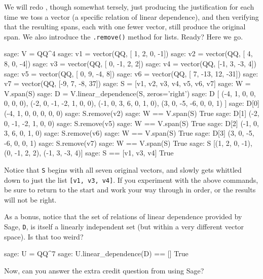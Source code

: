 We will redo , though somewhat tersely, just producing the justification for each time we toss a vector (a specific relation of linear dependence), and then verifying that the resulting spans, each with one fewer vector, still produce the original span.  We also introduce the \verb?.remove()? method for lists.  Ready?  Here we go.
%
\begin{sageexample}
sage: V = QQ^4
sage: v1 = vector(QQ,  [ 1,   2,  0,  -1])
sage: v2 = vector(QQ,  [ 4,   8,  0,  -4])
sage: v3 = vector(QQ,  [ 0,  -1,  2,   2])
sage: v4 = vector(QQ,  [-1,   3, -3,   4])
sage: v5 = vector(QQ,  [ 0,   9, -4,   8])
sage: v6 = vector(QQ,  [ 7, -13, 12, -31])
sage: v7 = vector(QQ,  [-9,   7, -8,  37])
sage: S = [v1, v2, v3, v4, v5, v6, v7]
sage: W = V.span(S)
sage: D = V.linear_dependence(S, zeros='right')
sage: D
[
(-4, 1, 0, 0, 0, 0, 0),
(-2, 0, -1, -2, 1, 0, 0),
(-1, 0, 3, 6, 0, 1, 0),
(3, 0, -5, -6, 0, 0, 1)
]
sage: D[0]
(-4, 1, 0, 0, 0, 0, 0)
sage: S.remove(v2)
sage: W == V.span(S)
True
sage: D[1]
(-2, 0, -1, -2, 1, 0, 0)
sage: S.remove(v5)
sage: W == V.span(S)
True
sage: D[2]
(-1, 0, 3, 6, 0, 1, 0)
sage: S.remove(v6)
sage: W == V.span(S)
True
sage: D[3]
(3, 0, -5, -6, 0, 0, 1)
sage: S.remove(v7)
sage: W == V.span(S)
True
sage: S
[(1, 2, 0, -1), (0, -1, 2, 2), (-1, 3, -3, 4)]
sage: S == [v1, v3, v4]
True
\end{sageexample}
%
Notice that \verb?S? begins with all seven original vectors, and slowly gets whittled down to just the list \verb?[v1, v3, v4]?.  If you experiment with the above commands, be sure to return to the start and work your way through in order, or the results will not be right.\par
%
As a bonus, notice that the set of relations of linear dependence provided by Sage, \verb?D?, is itself a linearly independent set (but within a very different vector space).  Is that too weird?
%
\begin{sageexample}
sage: U = QQ^7
sage: U.linear_dependence(D) == []
True
\end{sageexample}
%
Now, can you answer the extra credit question from  using Sage?
%
\begin{sageverbatim}
\end{sageverbatim}
%
